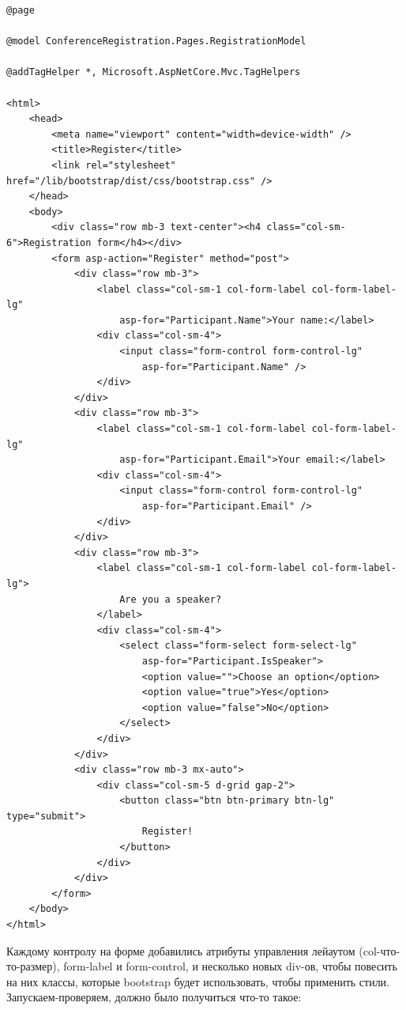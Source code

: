\documentclass[a5paper]{article}
\begin{document}
\begin{verbatim}
@page

@model ConferenceRegistration.Pages.RegistrationModel

@addTagHelper *, Microsoft.AspNetCore.Mvc.TagHelpers

<html>
    <head>
        <meta name="viewport" content="width=device-width" />
        <title>Register</title>
        <link rel="stylesheet" href="/lib/bootstrap/dist/css/bootstrap.css" />
    </head>
    <body>
        <div class="row mb-3 text-center"><h4 class="col-sm-6">Registration form</h4></div>
        <form asp-action="Register" method="post">
            <div class="row mb-3">
                <label class="col-sm-1 col-form-label col-form-label-lg" 
                    asp-for="Participant.Name">Your name:</label>
                <div class="col-sm-4">
                    <input class="form-control form-control-lg" 
                        asp-for="Participant.Name" />
                </div>
            </div>
            <div class="row mb-3">
                <label class="col-sm-1 col-form-label col-form-label-lg" 
                    asp-for="Participant.Email">Your email:</label>
                <div class="col-sm-4">
                    <input class="form-control form-control-lg" 
                        asp-for="Participant.Email" />
                </div>
            </div>
            <div class="row mb-3">
                <label class="col-sm-1 col-form-label col-form-label-lg">
                    Are you a speaker?
                </label>
                <div class="col-sm-4">
                    <select class="form-select form-select-lg" 
                        asp-for="Participant.IsSpeaker">
                        <option value="">Choose an option</option>
                        <option value="true">Yes</option>
                        <option value="false">No</option>
                    </select>
                </div>
            </div>
            <div class="row mb-3 mx-auto">
                <div class="col-sm-5 d-grid gap-2">
                    <button class="btn btn-primary btn-lg" type="submit">
                        Register!
                    </button>
                </div>
            </div>
        </form>
    </body>
</html>
\end{verbatim}

Каждому контролу на форме добавились атрибуты управления лейаутом (col-что-то-размер), form-label и form-control, и несколько новых div-ов, чтобы повесить на них классы, которые bootstrap будет использовать, чтобы применить стили. Запускаем-проверяем, должно было получиться что-то такое:
\end{document}
